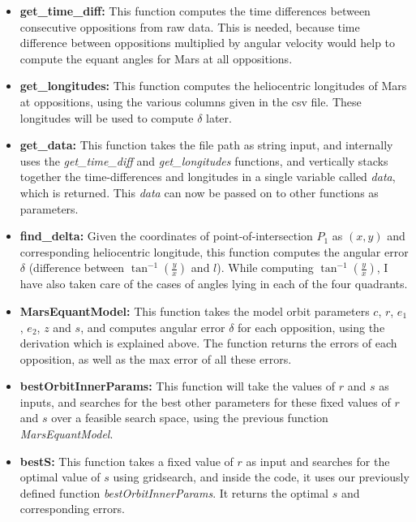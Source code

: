 \documentclass[11pt]{article}
\begin{document}
\begin{itemize}
    \item \textbf{get\_time\_diff:} This function computes the time differences between consecutive oppositions from raw data. This is needed, because time difference between oppositions multiplied by angular velocity would help to compute the equant angles for Mars at all oppositions.
    
    \item \textbf{get\_longitudes:} This function computes the heliocentric longitudes of Mars at oppositions, using the various columns given in the csv file. These longitudes will be used to compute $\delta$ later.
    
    \item \textbf{get\_data:} This function takes the file path as string input, and internally uses the \emph{get\_time\_diff} and \emph{get\_longitudes} functions, and vertically stacks together the time-differences and longitudes in a single variable called \emph{data}, which is returned. This \emph{data} can now be passed on to other functions as parameters.
    
    \item \textbf{find\_delta:} Given the coordinates of point-of-intersection $P_1$ as $(x,y)$ and corresponding heliocentric longitude, this function computes the angular error $\delta$ (difference between $\tan^{-1}(\frac{y}{x})$ and $l$). While computing $\tan^{-1}(\frac{y}{x})$, I have also taken care of the cases of angles lying in each of the four quadrants.
    
    \item \textbf{MarsEquantModel:} This function takes the model orbit parameters $c$, $r$, $e_1$, $e_2$, $z$ and $s$, and computes angular error $\delta$ for each opposition, using the  derivation which is explained above. The function returns the errors of each opposition, as well as the max error of all these errors.
    
    \item \textbf{bestOrbitInnerParams:} This function will take the values of $r$ and $s$ as inputs, and searches for the best other parameters for these fixed values of $r$ and $s$ over a feasible search space, using the previous function \emph{MarsEquantModel}.
    
    \item \textbf{bestS:} This function takes a fixed value of $r$ as input and searches for the optimal value of $s$ using gridsearch, and inside the code, it uses our previously defined function \emph{bestOrbitInnerParams}. It returns the optimal $s$ and corresponding errors.
    

\end{itemize}
\end{document}
